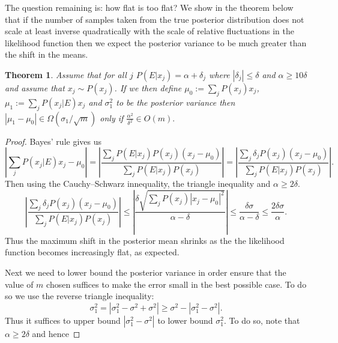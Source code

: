 \documentclass[aps,pra,amsmath,twocolumn,amssymb,superscriptaddress]{revtex4-1}
\newtheorem{theorem}{Theorem}
\begin{document}
The question remaining is: how flat is too flat?  We show in the theorem below that if the number of samples taken from the true posterior distribution does not scale at least inverse quadratically with the scale of relative fluctuations in the likelihood function then we expect the posterior variance to be much greater than the shift in the means.  
\begin{theorem}
Assume that for all $j$ $P(E|x_j) =\alpha+\delta_j$ where $|\delta_j|\le \delta$ and $\alpha \ge 10\delta$ and assume that $x_j\sim P(x_j)$.  If we then define $\mu_0 := \sum_{j} P(x_j) x_j$, $\mu_1:= \sum_j P(x_j|E) x_j$ and $\sigma_1^2$ to be the posterior variance then $|\mu_1 - \mu_0| \in \Omega(\sigma_1/\sqrt{m})$ only if
$
\frac{\alpha^2}{\delta^2}\in O(m) .
$\label{thm:stability}
\end{theorem}
\begin{proof}
Bayes' rule gives us
\begin{equation}
\left|\sum_j P(x_j|E) x_j -\mu_0\right|= \left|\frac{\sum_j P(E|x_j)P(x_j) (x_j -\mu_0)}{\sum_j P(E|x_j)P(x_j)}\right|=\left|\frac{\sum_j \delta_j P(x_j)(x_j -\mu_0)}{\sum_j P(E|x_j)P(x_j)}\right|.\label{eq:A1}
\end{equation}
Then using the Cauchy--Schwarz innequality, the triangle inequality and $\alpha\ge 2\delta$.
\begin{equation}
\left|\frac{\sum_j \delta_jP(x_j )( x_j -\mu_0)}{\sum_j P(E|x_j)P(x_j)}\right| \le \left|\frac{\delta \sqrt{\sum_j P(x_j) |x_j -\mu_0|^2}}{\alpha-\delta}\right|\le \frac{\delta  \sigma}{\alpha-\delta}\le \frac{2\delta{\sigma}}{\alpha}.\label{eq:A2}
\end{equation}
Thus the maximum shift in the posterior mean shrinks as the the likelihood function becomes increasingly flat, as expected.

Next we need to lower bound the posterior variance in order ensure that the value of $m$ chosen suffices to make the error small in the best possible case.
To do so we use the reverse triangle inequality:
\begin{equation}
\sigma_1^2 = |\sigma_1^2 -\sigma^2 +\sigma^2| \ge \sigma^2 - |\sigma_1^2-\sigma^2|.
\end{equation}
Thus it suffices to upper bound $|\sigma_1^2-\sigma^2|$ to lower bound $\sigma_1^2$.  To do so, note that $\alpha \ge 2\delta$ and hence


\end{proof}
\end{document}
